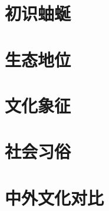 \documentclass{Paper}
\begin{document}
\makeheader
\tableofcontents
\newpage
\section{初识蚰蜒}

\section{生态地位}

\section{文化象征}

\section{社会习俗}

\section{中外文化对比}

\end{document}

